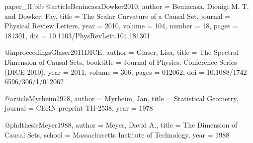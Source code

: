 
\begin{filecontents*}{paper_II.bib}
@article{BenincasaDowker2010,
  author  = {Benincasa, Dionigi M. T. and Dowker, Fay},
  title   = {The Scalar Curvature of a Causal Set},
  journal = {Physical Review Letters},
  year    = {2010},
  volume  = {104},
  number  = {18},
  pages   = {181301},
  doi     = {10.1103/PhysRevLett.104.181301}
}

@inproceedings{Glaser2011DICE,
  author    = {Glaser, Lisa},
  title     = {The Spectral Dimension of Causal Sets},
  booktitle = {Journal of Physics: Conference Series (DICE 2010)},
  year      = {2011},
  volume    = {306},
  pages     = {012062},
  doi       = {10.1088/1742-6596/306/1/012062}
}

@article{Myrheim1978,
  author  = {Myrheim, Jan},
  title   = {Statistical Geometry},
  journal = {CERN preprint TH-2538},
  year    = {1978}
}

@phdthesis{Meyer1988,
  author  = {Meyer, David A.},
  title   = {The Dimension of Causal Sets},
  school  = {Massachusetts Institute of Technology},
  year    = {1988}
}
\end{filecontents*}

\documentclass[11pt]{article}

\usepackage[margin=1in]{geometry}
\usepackage{amsmath,amssymb,amsthm,mathtools}
\usepackage{graphicx}
\usepackage{hyperref}
\usepackage{microtype}
\usepackage[numbers,sort&compress]{natbib}
\usepackage{xcolor}
\usepackage{float}                %
\usepackage[section]{placeins}    %

\hypersetup{
  colorlinks=true,
  linkcolor=blue!50!black,
  citecolor=blue!50!black,
  urlcolor=blue!50!black
}

\theoremstyle{plain}
\newtheorem{theorem}{Theorem}
\newtheorem{proposition}[theorem]{Proposition}
\newtheorem{lemma}[theorem]{Lemma}
\theoremstyle{definition}
\newtheorem{definition}[theorem]{Definition}
\theoremstyle{remark}
\newtheorem{remark}[theorem]{Remark}

\newcommand{\E}{\mathbb{E}}
\newcommand{\Var}{\mathrm{Var}}
\newcommand{\Boxop}{\Box}
\newcommand{\MM}{d_{\mathrm{MM}}}


